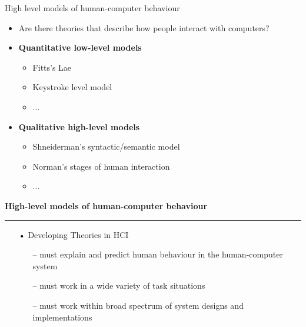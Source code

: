 \documentclass[pdf]{beamer}
\begin{document}
\begin{frame} \begin{center}
\LARGE{High level models of human-computer behaviour}
\end{center}

\begin{itemize}
\item Are there theories that describe how people interact with computers?

\item \textbf{Quantitative low-level models}
\begin{itemize}
\item Fitts's Lae
\item Keystroke level model
\item ...
\end{itemize}

\item \textbf{Qualitative high-level models}
\begin{itemize}
\item Shneiderman’s syntactic/semantic model
\item Norman’s stages of human interaction
\item ...
\end{itemize}
\end{itemize}

\bigskip
\bigskip \bigskip
\end{frame}



\begin{frame}
\vspace{8mm}
\textcolor{myBlue}{\textbf{\Large{High-level models of human-computer behaviour}}}

\textcolor{red}{\rule{10cm}{1mm}}

\begin{itemize}
\item[\textcolor{black}{•}] {Developing Theories in HCI }
	\begin{itemize}
	\item[\textcolor{black}{--}] must explain and predict human behaviour in the human-computer system
	\newline
	\item[\textcolor{black}{--}] must work in a wide variety of task situations
	\newline
	\item[\textcolor{black}{--}]must work within broad spectrum of system designs and implementations
	\newline
	\end{itemize}
\end{itemize}
\end{frame}
\end{document}
